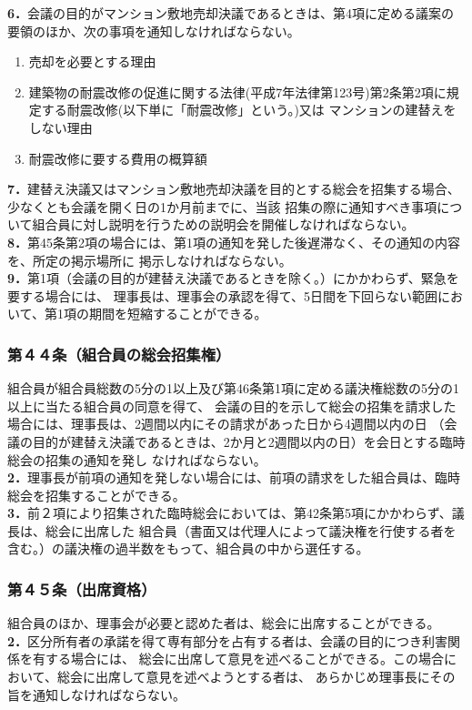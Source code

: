\documentclass[12pt,uplatex,dvipdfmx]{jsarticle}
\begin{document}
\textbf{6．}会議の目的がマンション敷地売却決議であるときは、第4項に定める議案の要領のほか、次の事項を通知しなければならない。
\begin{enumerate}
  \item 売却を必要とする理由
  \item 建築物の耐震改修の促進に関する法律(平成7年法律第123号)第2条第2項に規定する耐震改修(以下単に「耐震改修」という。)又は
    マンションの建替えをしない理由
  \item 耐震改修に要する費用の概算額
\end{enumerate}
\textbf{7．}建替え決議又はマンション敷地売却決議を目的とする総会を招集する場合、少なくとも会議を開く日の1か月前までに、当該
招集の際に通知すべき事項について組合員に対し説明を行うための説明会を開催しなければならない。\\
\textbf{8．}第45条第2項の場合には、第1項の通知を発した後遅滞なく、その通知の内容を、所定の掲示場所に
掲示しなければならない。\\
\textbf{9．}第1項（会議の目的が建替え決議であるときを除く。）にかかわらず、緊急を要する場合には、
理事長は、理事会の承認を得て、5日間を下回らない範囲において、第1項の期間を短縮することができる。\\
\subsubsection*{第４４条（組合員の総会招集権）}
組合員が組合員総数の5分の1以上及び第46条第1項に定める議決権総数の5分の1以上に当たる組合員の同意を得て、
会議の目的を示して総会の招集を請求した場合には、理事長は、2週間以内にその請求があった日から4週間以内の日
（会議の目的が建替え決議であるときは、2か月と2週間以内の日）を会日とする臨時総会の招集の通知を発し
なければならない。\\
\textbf{2．}理事長が前項の通知を発しない場合には、前項の請求をした組合員は、臨時総会を招集することができる。\\
\textbf{3．}前２項により招集された臨時総会においては、第42条第5項にかかわらず、議長は、総会に出席した
組合員（書面又は代理人によって議決権を行使する者を含む。）の議決権の過半数をもって、組合員の中から選任する。
\subsubsection*{第４５条（出席資格）}
組合員のほか、理事会が必要と認めた者は、総会に出席することができる。\\
\textbf{2．}区分所有者の承諾を得て専有部分を占有する者は、会議の目的につき利害関係を有する場合には、
総会に出席して意見を述べることができる。この場合において、総会に出席して意見を述べようとする者は、
あらかじめ理事長にその旨を通知しなければならない。
\end{document}
